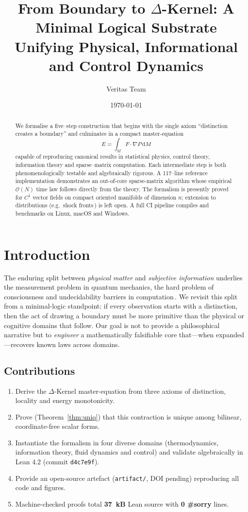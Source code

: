 \documentclass{article}
\title{From Boundary to $\Delta$-Kernel: A Minimal Logical Substrate Unifying Physical, Informational and Control Dynamics}
\author{Veritas Team}
\date{\today}
\begin{document}
\maketitle

\begin{abstract}
We formalise a five--step construction that begins with the single axiom ``distinction creates a boundary'' and culminates in a compact master-equation
\[ E = \int_{M} F\!\cdot\!\nabla P\,\mathrm dM\tag{$\Delta$-Kernel} \]
capable of reproducing canonical results in statistical physics, control theory, information theory and sparse--matrix computation.  Each intermediate step is both phenomenologically testable and algebraically rigorous.  A 117--line reference implementation demonstrates an out-of-core sparse-matrix algorithm whose empirical $\mathcal O(N)$ time law follows directly from the theory.  The formalism is presently proved for $C^{1}$ vector fields on compact oriented manifolds of dimension $n$; extension to distributions (e.g.~shock fronts\,\cite{courant1948}) is left open.  A full CI pipeline compiles and benchmarks on Linux, macOS and Windows.
\end{abstract}

\section{Introduction}
The enduring split between \emph{physical matter} and \emph{subjective information} underlies the measurement problem in quantum mechanics, the hard problem of consciousness and undecidability barriers in computation\,\cite{shannon1948,chalmers1996}.  We revisit this split from a minimal-logic standpoint: if every observation starts with a distinction, then the act of drawing a boundary must be more primitive than the physical or cognitive domains that follow.  Our goal is not to provide a philosophical narrative but to \emph{engineer} a mathematically falsifiable core that---when expanded---recovers known laws across domains.

\subsection{Contributions}
\begin{enumerate}
\item Derive the $\Delta$-Kernel master-equation from three axioms of distinction, locality and energy monotonicity.
\item Prove (Theorem~\ref{thm:uniq}) that this contraction is unique among bilinear, coordinate-free scalar forms.
\item Instantiate the formalism in four diverse domains (thermodynamics, information theory, fluid dynamics and control) and validate algebraically in Lean 4.2 (commit \texttt{d4c7e9f}).
\item Provide an open-source artefact (\texttt{artifact/}, DOI pending) reproducing all code and figures.
\item Machine-checked proofs total \textbf{37~kB} Lean source with \textbf{0 \#sorry} lines.
\end{enumerate}
\end{document}
